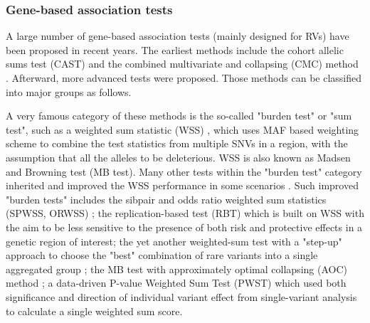 \documentclass[12pt]{article}
\begin{document}
\subsubsection{Gene-based association tests}\label{sec:bg:Gb test}
A large number of gene-based association tests (mainly designed for RVs) have been proposed in recent years. The earliest methods include the cohort allelic sums test (CAST)\cite{Morgenthaler2007} and the combined multivariate and collapsing (CMC) method \cite{Li2008}. Afterward, more advanced tests were proposed. Those methods can be classified into major groups as follows.

A very famous category of these methods is the so-called "burden test" or "sum test", such as a weighted sum statistic (WSS) \cite{Madsen2009}, which uses MAF based weighting scheme to combine the test statistics from multiple SNVs in a region, with the assumption that all the alleles to be deleterious. WSS is also known as Madsen and Browning test (MB test). Many other tests within the "burden test" category inherited and improved the WSS performance in some scenarios \cite{Hoffmann2010,Zhang2010,Ionita-Laza2011,Feng2011}. Such improved "burden tests" includes the sibpair and odds ratio weighted sum statistics (SPWSS, ORWSS) \cite{Zhu2010,Feng2011}; the replication-based test (RBT) \cite{Ionita-Laza2011} which is built on WSS with the aim to be less sensitive to the presence of both risk and protective effects in a genetic region of interest; the yet another weighted-sum test with a "step-up" approach to choose the "best" combination of rare variants into a single aggregated group \cite{Hoffmann2010}; the MB test with approximately optimal collapsing (AOC) method \cite{Zhang2010}; a data-driven P-value Weighted Sum Test (PWST) \cite{Zhang2011} which used both significance and direction of individual variant effect from single-variant analysis to calculate a single weighted sum score.
\end{document}
